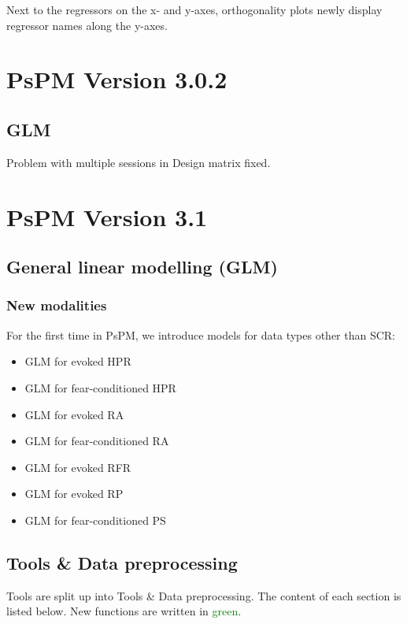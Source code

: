 \documentclass[english]{article}
\numberwithin{equation}{section}
\numberwithin{figure}{section}
\begin{document}
Next to the regressors on the x- and y-axes, orthogonality plots newly
display regressor names along the y-axes. 

\section{PsPM Version 3.0.2}

\subsection*{GLM}

Problem with multiple sessions in Design matrix fixed.

\section{PsPM Version 3.1}

\subsection*{General linear modelling (GLM)}

\subsubsection*{New modalities}

For the first time in PsPM, we introduce models for data types other
than SCR:
\begin{itemize}
\item GLM for evoked HPR
\item GLM for fear-conditioned HPR
\item GLM for evoked RA
\item GLM for fear-conditioned RA
\item GLM for evoked RFR
\item GLM for evoked RP
\item GLM for fear-conditioned PS
\end{itemize}

\subsection*{Tools \& Data preprocessing}

Tools are split up into Tools \& Data preprocessing. The content of
each section is listed below. New functions are written in \textcolor{green}{green}.
\end{document}
